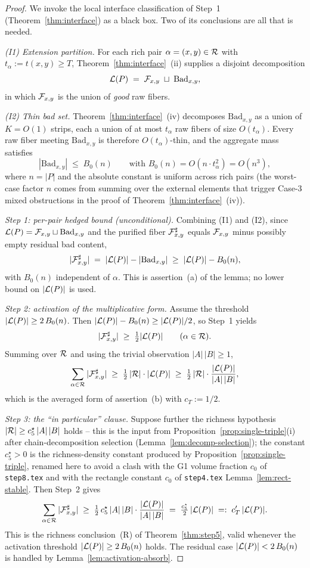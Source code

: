 \begin{proof}
We invoke the local interface classification of Step~1
(Theorem~\ref{thm:interface}) as a black box. Two of its conclusions are
all that is needed.

\smallskip
\noindent\emph{(I1) Extension partition.} For each rich pair
$\alpha = (x,y) \in \mathcal{R}$ with $t_\alpha := t(x,y) \ge T$,
Theorem~\ref{thm:interface}~(ii) supplies a disjoint decomposition
\[
\mathcal{L}(P) \;=\; \mathcal{F}_{x,y} \;\sqcup\; \mathrm{Bad}_{x,y},
\]
in which $\mathcal{F}_{x,y}$ is the union of \emph{good} raw fibers.

\smallskip
\noindent\emph{(I2) Thin bad set.} Theorem~\ref{thm:interface}~(iv)
decomposes $\mathrm{Bad}_{x,y}$ as a union of $K = O(1)$ strips, each a
union of at most $t_\alpha$ raw fibers of size $O(t_\alpha)$. Every raw
fiber meeting $\mathrm{Bad}_{x,y}$ is therefore $O(t_\alpha)$-thin, and
the aggregate mass satisfies
\[
|\mathrm{Bad}_{x,y}| \;\le\; B_0(n)
\qquad\text{with } B_0(n) = O(n\cdot t_\alpha^2) = O(n^3),
\]
where $n = |P|$ and the absolute constant is uniform across rich pairs
(the worst-case factor $n$ comes from summing over the external elements
that trigger Case-3 mixed obstructions in the proof of
Theorem~\ref{thm:interface}~(iv)).

\smallskip
\noindent\emph{Step 1: per-pair hedged bound (unconditional).}
Combining (I1) and (I2), since $\mathcal{L}(P) = \mathcal{F}_{x,y} \sqcup \mathrm{Bad}_{x,y}$
and the purified fiber $\mathcal{F}_{x,y}^{\sharp}$ equals $\mathcal{F}_{x,y}$ minus possibly empty
residual bad content,
\[
|\mathcal{F}_{x,y}^{\sharp}| \;=\; |\mathcal{L}(P)| - |\mathrm{Bad}_{x,y}|
       \;\ge\; |\mathcal{L}(P)| - B_0(n),
\]
with $B_0(n)$ independent of $\alpha$. This is assertion~(a) of the
lemma; no lower bound on $|\mathcal{L}(P)|$ is used.

\smallskip
\noindent\emph{Step 2: activation of the multiplicative form.}
Assume the threshold $|\mathcal{L}(P)| \ge 2\,B_0(n)$. Then
$|\mathcal{L}(P)| - B_0(n) \ge |\mathcal{L}(P)|/2$, so Step~1 yields
\[
|\mathcal{F}_{x,y}^{\sharp}| \;\ge\; \tfrac12|\mathcal{L}(P)|
\qquad (\alpha \in \mathcal{R}).
\]
Summing over $\mathcal{R}$ and using the trivial observation
$|A|\,|B| \ge 1$,
\[
\sum_{\alpha \in \mathcal{R}} |\mathcal{F}_{x,y}^{\sharp}|
\;\ge\; \tfrac{1}{2}\,|\mathcal{R}|\cdot|\mathcal{L}(P)|
\;\ge\; \tfrac{1}{2}\,|\mathcal{R}|\cdot \frac{|\mathcal{L}(P)|}{|A|\,|B|},
\]
which is the averaged form of assertion~(b) with $c_T := 1/2$.

\smallskip
\noindent\emph{Step 3: the ``in particular'' clause.}
Suppose further the richness hypothesis
$|\mathcal{R}| \ge c_5^\star\,|A|\,|B|$
holds -- this is the input from Proposition~\ref{prop:single-triple}(i)
after chain-decomposition selection (Lemma~\ref{lem:decomp-selection});
the constant $c_5^\star>0$ is the richness-density constant produced
by Proposition~\ref{prop:single-triple}, renamed here to avoid a
clash with the G1 volume fraction $c_0$ of \texttt{step8.tex} and
with the rectangle constant $c_0$ of \texttt{step4.tex}
Lemma~\ref{lem:rect-stable}. Then Step~2 gives
\[
\sum_{\alpha \in \mathcal{R}} |\mathcal{F}_{x,y}^{\sharp}|
\;\ge\; \tfrac{1}{2}\,c_5^\star\,|A|\,|B|\cdot\frac{|\mathcal{L}(P)|}{|A|\,|B|}
\;=\; \tfrac{c_5^\star}{2}\,|\mathcal{L}(P)|
\;=:\; c'_T\,|\mathcal{L}(P)|.
\]
This is the richness conclusion~(R) of Theorem~\ref{thm:step5}, valid
whenever the activation threshold $|\mathcal{L}(P)| \ge 2\,B_0(n)$ holds. The
residual case $|\mathcal{L}(P)| < 2\,B_0(n)$ is handled by
Lemma~\ref{lem:activation-absorb}.
\end{proof}

